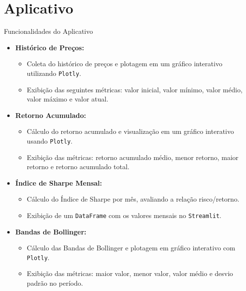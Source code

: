 \documentclass[aspectratio=169]{beamer}
\begin{document}
\section{Aplicativo}
\begin{frame}{Funcionalidades do Aplicativo}
  \begin{itemize}
    \item \textbf{Histórico de Preços:}
    \begin{itemize}
      \item Coleta do histórico de preços e plotagem em um gráfico interativo utilizando \texttt{Plotly}.
      \item Exibição das seguintes métricas: valor inicial, valor mínimo, valor médio, valor máximo e valor atual.
    \end{itemize}

    \item \textbf{Retorno Acumulado:}
    \begin{itemize}
      \item Cálculo do retorno acumulado e visualização em um gráfico interativo usando \texttt{Plotly}.
      \item Exibição das métricas: retorno acumulado médio, menor retorno, maior retorno e retorno acumulado total.
    \end{itemize}

    \item \textbf{Índice de Sharpe Mensal:}
    \begin{itemize}
      \item Cálculo do Índice de Sharpe por mês, avaliando a relação risco/retorno.
      \item Exibição de um \texttt{DataFrame} com os valores mensais no \texttt{Streamlit}.
    \end{itemize}

    \item \textbf{Bandas de Bollinger:}
    \begin{itemize}
      \item Cálculo das Bandas de Bollinger e plotagem em gráfico interativo com \texttt{Plotly}.
      \item Exibição das métricas: maior valor, menor valor, valor médio e desvio padrão no período.
    \end{itemize}
  \end{itemize}
\end{frame}
\end{document}

